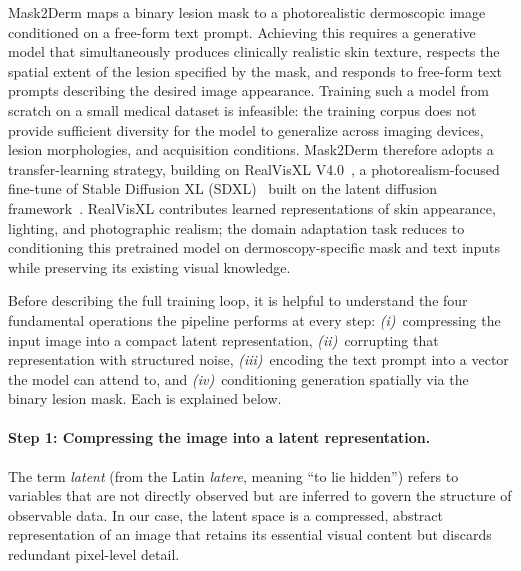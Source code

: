 Mask2Derm maps a binary lesion mask to a photorealistic dermoscopic image conditioned on a free-form text prompt. Achieving this requires a generative model that simultaneously produces clinically realistic skin texture, respects the spatial extent of the lesion specified by the mask, and responds to free-form text prompts describing the desired image appearance. Training such a model from scratch on a small medical dataset is infeasible: the training corpus does not provide sufficient diversity for the model to generalize across imaging devices, lesion morphologies, and acquisition conditions. Mask2Derm therefore adopts a transfer-learning strategy, building on RealVisXL V4.0~\cite{SG161222RealVisXL}, a photorealism-focused fine-tune of Stable Diffusion XL (SDXL)~\cite{podell2023sdxl} built on the latent diffusion framework~\cite{Rombach2022LDM}. RealVisXL contributes learned representations of skin appearance, lighting, and photographic realism; the domain adaptation task reduces to conditioning this pretrained model on dermoscopy-specific mask and text inputs while preserving its existing visual knowledge.

Before describing the full training loop, it is helpful to understand the four fundamental operations the pipeline performs at every step: \emph{(i)}~compressing the input image into a compact latent representation, \emph{(ii)}~corrupting that representation with structured noise, \emph{(iii)}~encoding the text prompt into a vector the model can attend to, and \emph{(iv)}~conditioning generation spatially via the binary lesion mask. Each is explained below.

\paragraph{Step 1: Compressing the image into a latent representation.}
The term \emph{latent} (from the Latin \emph{latere}, meaning ``to lie hidden'') refers to variables that are not directly observed but are inferred to govern the structure of observable data. In our case, the latent space is a compressed, abstract representation of an image that retains its essential visual content but discards redundant pixel-level detail.

